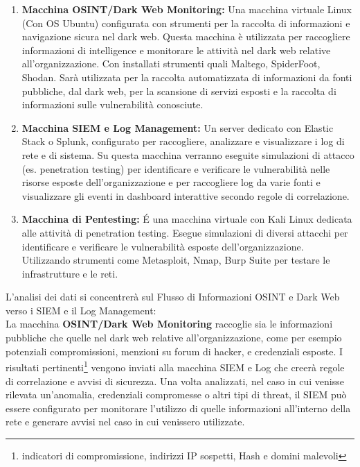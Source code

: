 \begin{enumerate}
    \item \textbf{Macchina OSINT/Dark Web Monitoring:} 
    Una macchina virtuale Linux (Con OS Ubuntu) configurata con strumenti per la raccolta di informazioni e navigazione sicura nel dark web.
    Questa macchina è utilizzata per raccogliere informazioni di intelligence e monitorare le attività nel dark web relative all'organizzazione.
    Con installati strumenti quali Maltego, SpiderFoot, Shodan.
    Sarà utilizzata per la raccolta automatizzata di informazioni da fonti pubbliche, dal dark web, per la scansione di servizi esposti e la raccolta di informazioni sulle vulnerabilità conosciute.
    \item \textbf{Macchina SIEM e Log Management:}
     Un server dedicato con Elastic Stack o Splunk, configurato per raccogliere, analizzare e visualizzare i log di rete e di sistema. Su questa macchina verranno eseguite simulazioni di attacco (es. penetration testing) per identificare e verificare le vulnerabilità nelle risorse esposte dell'organizzazione e per raccogliere log da varie fonti e visualizzare gli eventi in dashboard interattive secondo regole di correlazione.
    \item \textbf{Macchina di Pentesting:}
    \'E una macchina virtuale con Kali Linux dedicata alle attività di penetration testing. Esegue simulazioni di diversi attacchi per identificare e verificare le vulnerabilità esposte dell'organizzazione.
    Utilizzando strumenti come Metasploit, Nmap, Burp Suite per testare le infrastrutture e le reti.
\end{enumerate}



L'analisi dei dati si concentrerà sul Flusso di Informazioni OSINT e Dark Web verso i SIEM e il Log Management:\\

La macchina \textbf{OSINT/Dark Web Monitoring} raccoglie sia le informazioni pubbliche che quelle nel dark web relative all'organizzazione, come per esempio potenziali compromissioni, menzioni su forum di hacker, e credenziali esposte. I risultati pertinenti\footnote{indicatori di compromissione, indirizzi IP sospetti, Hash e domini malevoli} vengono inviati alla macchina SIEM e Log che creerà regole di correlazione e avvisi di sicurezza.
Una volta analizzati, nel caso in cui venisse rilevata un'anomalia, credenziali compromesse o altri tipi di threat, il SIEM può essere configurato per monitorare l'utilizzo di quelle informazioni all'interno della rete e generare avvisi nel caso in cui venissero utilizzate.


